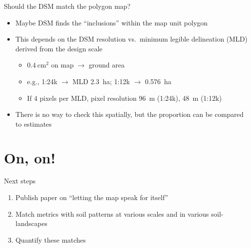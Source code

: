 \documentclass[aspectratio=169, 10pt]{beamer}
\begin{document}
\begin{frame}{Should the DSM match the polygon map?}
    \begin{itemize}
        \item Maybe DSM finds the ``inclusions'' within the map unit polygon
        \item This depends on the DSM resolution vs.\ minimum legible delineation (MLD) derived from the design scale
        \begin{itemize}
            \item $0.4~\mathrm{cm}^2$ on map $\to$ ground area
            \item e.g., 1:24k $\to$ MLD 2.3~ha; 1:12k $\to$ 0.576~ha
            \item If 4 pixels per MLD, pixel resolution 96~m (1:24k), 48~m (1:12k)
        \end{itemize}
        \item There is no way to check this spatially, but the proportion can be compared to estimates
    \end{itemize}
  \end{frame}
  
\section{On, on!}

\begin{frame}{Next steps}
\begin{enumerate}
    \item Publish paper on ``letting the map speak for itself''
    \item Match metrics with soil patterns at various scales and in various soil-landscapes
    \item Quantify these matches
\end{enumerate}
\end{frame}



\end{document}
